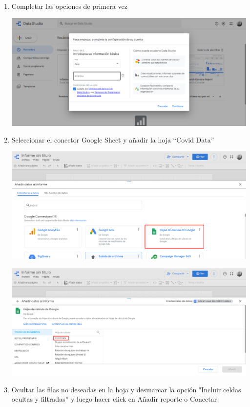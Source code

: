 \documentclass{article}
\begin{document}
\begin{enumerate}[\tab 1.]
        \item Completar las opciones de primera vez
        \begin{center}
            \includegraphics[width=13cm]{./images/6.png}
        \end{center}
        \newpage
        \item Seleccionar el conector Google Sheet y añadir la hoja “Covid Data”
        \begin{center}
            \includegraphics[width=13cm]{./images/7.png}
        \end{center}
        \begin{center}
            \includegraphics[width=13cm]{./images/8.png}
        \end{center}
       \newpage
        \item Ocultar las filas no deseadas en la hoja y desmarcar la opción "Incluir celdas ocultas y filtradas” y luego hacer click en Añadir reporte o Conectar

\end{enumerate}
\end{document}
